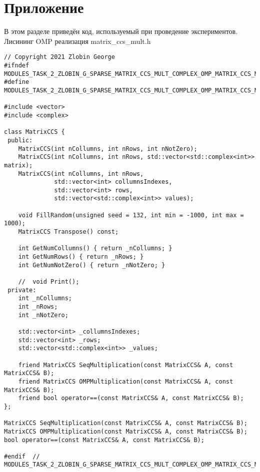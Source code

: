 \documentclass{report}
\begin{document}
\section*{Приложение}
В этом разделе приведён код, используемый при проведение экспериментов. \\
Лисининг OMP реализация matrix\_ccs\_mult.h
\begin{lstlisting}
// Copyright 2021 Zlobin George
#ifndef MODULES_TASK_2_ZLOBIN_G_SPARSE_MATRIX_CCS_MULT_COMPLEX_OMP_MATRIX_CCS_MULT_H_
#define MODULES_TASK_2_ZLOBIN_G_SPARSE_MATRIX_CCS_MULT_COMPLEX_OMP_MATRIX_CCS_MULT_H_

#include <vector>
#include <complex>

class MatrixCCS {
 public:
    MatrixCCS(int nCollumns, int nRows, int nNotZero);
    MatrixCCS(int nCollumns, int nRows, std::vector<std::complex<int>> matrix);
    MatrixCCS(int nCollumns, int nRows,
              std::vector<int> collumnsIndexes,
              std::vector<int> rows,
              std::vector<std::complex<int>> values);

    void FillRandom(unsigned seed = 132, int min = -1000, int max = 1000);
    MatrixCCS Transpose() const;

    int GetNumCollumns() { return _nCollumns; }
    int GetNumRows() { return _nRows; }
    int GetNumNotZero() { return _nNotZero; }

    //  void Print();
 private:
    int _nCollumns;
    int _nRows;
    int _nNotZero;

    std::vector<int> _collumnsIndexes;
    std::vector<int> _rows;
    std::vector<std::complex<int>> _values;

    friend MatrixCCS SeqMultiplication(const MatrixCCS& A, const MatrixCCS& B);
    friend MatrixCCS OMPMultiplication(const MatrixCCS& A, const MatrixCCS& B);
    friend bool operator==(const MatrixCCS& A, const MatrixCCS& B);
};

MatrixCCS SeqMultiplication(const MatrixCCS& A, const MatrixCCS& B);
MatrixCCS OMPMultiplication(const MatrixCCS& A, const MatrixCCS& B);
bool operator==(const MatrixCCS& A, const MatrixCCS& B);

#endif  // MODULES_TASK_2_ZLOBIN_G_SPARSE_MATRIX_CCS_MULT_COMPLEX_OMP_MATRIX_CCS_MULT_H_

\end{lstlisting}
\end{document}
